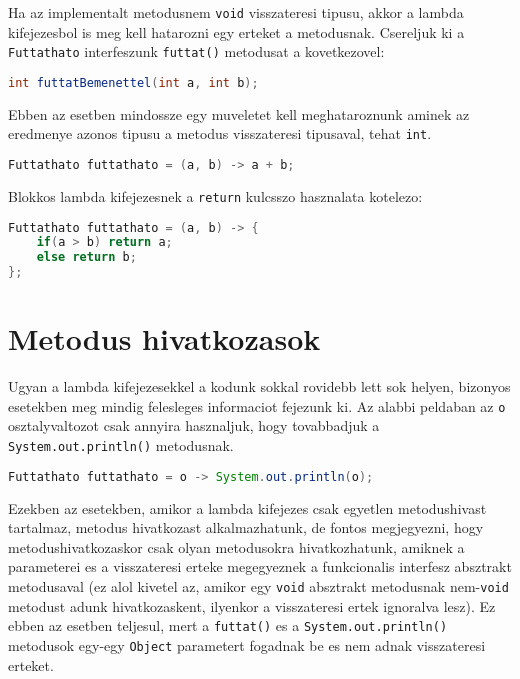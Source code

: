 \documentclass{article}
\let\l\lstinline
\begin{document}
Ha az implementalt metodusnem \l{void} visszateresi tipusu, akkor a lambda kifejezesbol is meg kell hatarozni egy erteket a metodusnak. Csereljuk ki a \l{Futtathato} interfeszunk \l{futtat()} metodusat a kovetkezovel:

\begin{lstlisting}[language=Java, caption=Absztrakt metodus visszateresi ertekkel]
int futtatBemenettel(int a, int b);
\end{lstlisting}

Ebben az esetben mindossze egy muveletet kell meghataroznunk aminek az eredmenye azonos tipusu a metodus visszateresi tipusaval, tehat \l{int}.

\begin{lstlisting}[language=Java, caption=Nem void absztrakt metodus implementalasa lambda kifejezessel]
Futtathato futtathato = (a, b) -> a + b;
\end{lstlisting}

Blokkos lambda kifejezesnek a \l{return} kulcsszo hasznalata kotelezo:

\begin{lstlisting}[language=Java, caption=Nem void absztrakt metodus implementalasa lambda kifejezessel]
Futtathato futtathato = (a, b) -> {
	if(a > b) return a;
	else return b;
};
\end{lstlisting}
\newpage

\section{Metodus hivatkozasok}

Ugyan a lambda kifejezesekkel a kodunk sokkal rovidebb lett sok helyen, bizonyos esetekben meg mindig felesleges informaciot fejezunk ki. Az alabbi peldaban az \l{o} osztalyvaltozot csak annyira hasznaljuk, hogy tovabbadjuk a \l{System.out.println()} metodusnak.

\begin{lstlisting}[language=Java, caption=Parameteres absztrakt metodus implementalasa lambda kifejezessel]
Futtathato futtathato = o -> System.out.println(o);
\end{lstlisting}

Ezekben az esetekben, amikor a lambda kifejezes csak egyetlen metodushivast tartalmaz, metodus hivatkozast alkalmazhatunk, de fontos megjegyezni, hogy metodushivatkozaskor csak olyan metodusokra hivatkozhatunk, amiknek a parameterei es a visszateresi erteke megegyeznek a funkcionalis interfesz absztrakt metodusaval (ez alol kivetel az, amikor egy \l{void} absztrakt metodusnak nem-\l{void} metodust adunk hivatkozaskent, ilyenkor a visszateresi ertek ignoralva lesz). Ez ebben az esetben teljesul, mert a \l{futtat()} es a \l{System.out.println()} metodusok egy-egy \l{Object} parametert fogadnak be es nem adnak visszateresi erteket.
\end{document}
